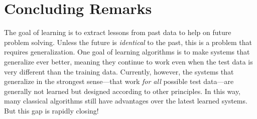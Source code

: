 \section{Concluding Remarks}
The goal of learning is to extract lessons from past data to help on future problem solving. Unless the future is \textit{identical} to the past, this is a problem that requires generalization. One goal of learning algorithms is to make systems that generalize ever better, meaning they continue to work even when the test data is very different than the training data. Currently, however, the systems that generalize in the strongest sense—that work \textit{for all} possible test data—are generally not learned but designed according to other principles. In this way, many classical algorithms still have advantages over the latest learned systems. But this gap is rapidly closing!